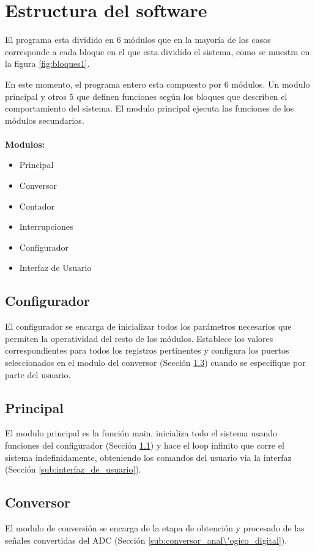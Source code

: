 
\section{Estructura del software} %
\label{sec:estructura_del_software}

El programa esta dividido en 6 m\'odulos que en la mayor\'ia de los casos corresponde a cada bloque en el que esta dividido el sistema, como se muestra en la figura \ref{fig:bloques1}.

En este momento, el programa entero esta compuesto por 6 m\'odulos. Un modulo principal y otros 5 que definen funciones seg\'un los bloques que describen el comportamiento del sistema. El modulo principal ejecuta las funciones de los m\'odulos secundarios.

\paragraph{}
\textbf{Modulos:}
\begin{itemize}
  \item Principal
  \item Conversor
  \item Contador
  \item Interrupciones
  \item Configurador
  \item Interfaz de Usuario
\end{itemize}

\subsection{Configurador}\label{sec:configuradorsw}
El configurador se encarga de inicializar todos los par\'ametros necesarios que permiten la operatividad del resto de los m\'odulos. Establece los valores correspondientes para todos los registros pertinentes y configura los puertos seleccionados en el modulo del conversor (Secci\'on \ref{sec:conversorsw}) cuando se especifique por parte del usuario.
\subsection{Principal}
El modulo principal es la funci\'on main, inicializa todo el sistema usando funciones del configurador (Secci\'on \ref{sec:configuradorsw}) y hace el loop infinito que corre el sistema indefinidamente, obteniendo los comandos del usuario via la interfaz (Secci\'on \ref{sub:interfaz_de_usuario}).

\subsection{Conversor}\label{sec:conversorsw}
El modulo de conversi\'on se encarga de la etapa de obtenci\'on y procesado de las se\~nales convertidas del ADC (Secci\'on \ref{sub:conversor_anal\'ogico_digital}).

